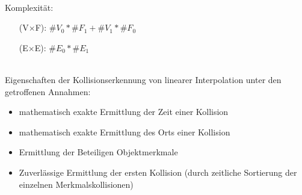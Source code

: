 \begin{itemize}
\begin{itemize}
		\end{itemize}
\ \\
		Komplexität:
\begin{itemize}
			\item [(V$\times$F):] $\#V_0*\#F_1 + \#V_1*\#F_0$
			\item [(E$\times$E):] $\#E_0*\#E_1$
		\end{itemize}
\ \\
		Eigenschaften der Kollisionserkennung von linearer Interpolation unter den getroffenen Annahmen:
		\begin{itemize}
			\item mathematisch exakte Ermittlung der Zeit einer Kollision
			\item mathematisch exakte Ermittlung des Orts einer Kollision
			\item Ermittlung der Beteiligen Objektmerkmale
			\item Zuverlässige Ermittlung der ersten Kollision (durch zeitliche Sortierung der einzelnen Merkmalskollisionen)
		\end{itemize}
\end{itemize}

